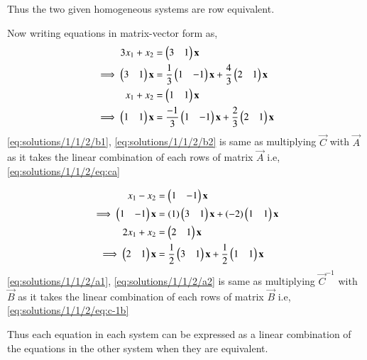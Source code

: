 Thus the two given homogeneous systems are row equivalent.

Now writing equations in matrix-vector form as, 
\begin{align}
    3x_1 + x_2 &= \begin{pmatrix}3&1\end{pmatrix}\mathbf{x} \\
    \implies \begin{pmatrix}3&1\end{pmatrix}\mathbf{x} &= \frac{1}{3}\begin{pmatrix}1&-1\end{pmatrix}\mathbf{x} + \frac{4}{3}\begin{pmatrix}2&1\end{pmatrix}\mathbf{x} \label{eq:solutions/1/1/2/b1}\\
    x_1 + x_2 &= \begin{pmatrix}1&1\end{pmatrix}\mathbf{x} \\
    \implies \begin{pmatrix}1&1\end{pmatrix}\mathbf{x} &= \frac{-1}{3}\begin{pmatrix}1&-1\end{pmatrix}\mathbf{x} + 
    \frac{2}{3}\begin{pmatrix}2&1\end{pmatrix}\mathbf{x} \label{eq:solutions/1/1/2/b2}
\end{align}
\eqref{eq:solutions/1/1/2/b1}, \eqref{eq:solutions/1/1/2/b2} is same as multiplying $\vec{C}$ with $\vec{A}$ as it takes the linear combination of each rows of matrix $\vec{A}$ i.e, \eqref{eq:solutions/1/1/2/eq:ca}

\begin{align}
    x_1 - x_2 &= \begin{pmatrix}1&-1\end{pmatrix}\mathbf{x} \\
    \implies\begin{pmatrix}1&-1\end{pmatrix}\mathbf{x} &= (1)\begin{pmatrix}3&1\end{pmatrix}\mathbf{x} + (-2)\begin{pmatrix}1&1\end{pmatrix}\mathbf{x} \label{eq:solutions/1/1/2/a1}\\
    2x_1 + x_2 &= \begin{pmatrix}2&1\end{pmatrix}\mathbf{x} \\
    \implies \begin{pmatrix}2&1\end{pmatrix}\mathbf{x} &= \frac{1}{2}\begin{pmatrix}3&1\end{pmatrix}\mathbf{x} + \frac{1}{2}\begin{pmatrix}1&1\end{pmatrix}\mathbf{x} \label{eq:solutions/1/1/2/a2}
\end{align}
\eqref{eq:solutions/1/1/2/a1}, \eqref{eq:solutions/1/1/2/a2} is same as multiplying $\vec{C}^{-1}$ with $\vec{B}$ as it takes the linear combination of each rows of matrix $\vec{B}$ i.e, \eqref{eq:solutions/1/1/2/eq:c-1b}

Thus each equation in each system can be expressed as a linear combination of the equations in the other system when they are equivalent. 

